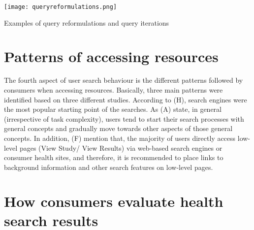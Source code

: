 \documentclass[]{article}
\begin{document}
\begin{table}[t!]
	\texttt{[image: queryreformulations.png]}
	\caption{Examples of query reformulations and query iterations\label{tabel2}}
\end{table} 

\section{Patterns of accessing resources}

The fourth aspect of user search behaviour is the different patterns followed by consumers when accessing resources. Basically, three main patterns were identified based on three different studies. According to (H), search engines were the most popular starting point of the searches. As (A) state, in general (irrespective of task complexity), users tend to start their search processes with general concepts and gradually move towards other aspects of those general concepts. In addition, (F) mention that, the majority of users directly access low-level pages (View Study/ View Results) via web-based search engines or consumer health sites, and therefore, it is recommended to place links to background information and other search features on low-level pages.


\section{How consumers evaluate health search results}
\end{document}
